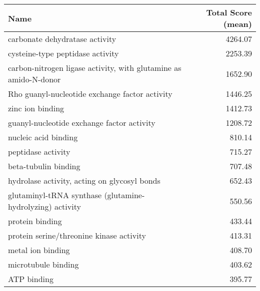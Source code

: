 \begin{table}[h]
\begin{center} \sf
\begin{tabular}{p{}r}
\toprule
\textbf{Name}                                                    & \textbf{Total Score (mean)} \\ \midrule
carbonate dehydratase activity                                   & 4264.07                     \\
cysteine-type peptidase activity                                 & 2253.39                     \\
carbon-nitrogen ligase activity, with glutamine as amido-N-donor & 1652.90                     \\
Rho guanyl-nucleotide exchange factor activity                   & 1446.25                     \\
zinc ion binding                                                 & 1412.73                     \\
guanyl-nucleotide exchange factor activity                       & 1208.72                     \\
nucleic acid binding                                             & 810.14                      \\
peptidase activity                                               & 715.27                      \\
beta-tubulin binding                                             & 707.48                      \\
hydrolase activity, acting on glycosyl bonds                     & 652.43                      \\
glutaminyl-tRNA synthase (glutamine-hydrolyzing) activity        & 550.56                      \\
protein binding                                                  & 433.44                      \\
protein serine/threonine kinase activity                         & 413.31                      \\
metal ion binding                                                & 408.70                      \\
microtubule binding                                              & 403.62                      \\
ATP binding                                                      & 395.77                      \\

\end{tabular}
\end{center}
\end{table}
